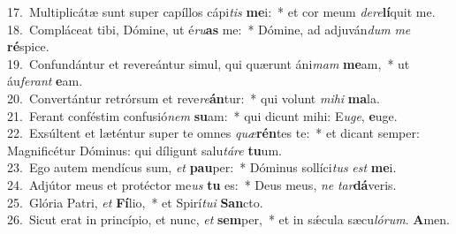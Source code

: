 {17.~}Multiplicátæ sunt super capíllos cápi\textit{tis} \textbf{me}i:~* et cor meum \textit{de}\textit{re}\textbf{lí}quit me.\\
{18.~}Compláceat tibi, Dómine, ut é\textit{ru}\textbf{as} me:~* Dómine, ad adjuván\textit{dum} \textit{me} \textbf{ré}spice.\\
{19.~}Confundántur et revereántur simul, qui quærunt áni\textit{mam} \textbf{me}am,~* ut áu\textit{fe}\textit{rant} \textbf{e}am.\\
{20.~}Convertántur retrórsum et reve\textit{re}\textbf{án}tur:~* qui volunt \textit{mi}\textit{hi} \textbf{ma}la.\\
{21.~}Ferant conféstim confusió\textit{nem} \textbf{su}am:~* qui dicunt mihi: E\textit{u}\textit{ge}, \textbf{e}uge.\\
{22.~}Exsúltent et læténtur super te omnes \textit{quæ}\textbf{rén}tes te:~* et dicant semper: Magnificétur Dóminus: qui díligunt salu\textit{tá}\textit{re} \textbf{tu}um.\\
{23.~}Ego autem mendícus sum, \textit{et} \textbf{pau}per:~* Dóminus sollíci\textit{tus} \textit{est} \textbf{me}i.\\
{24.~}Adjútor meus et protéctor me\textit{us} \textbf{tu} es:~* Deus meus, \textit{ne} \textit{tar}\textbf{dá}veris.\\
{25.~}Glória Patri, \textit{et} \textbf{Fí}lio,~* et Spirí\textit{tu}\textit{i} \textbf{San}cto.\\
{26.~}Sicut erat in princípio, et nunc, \textit{et} \textbf{sem}per,~* et in sǽcula sæcu\textit{ló}\textit{rum}. \textbf{A}men.\\
